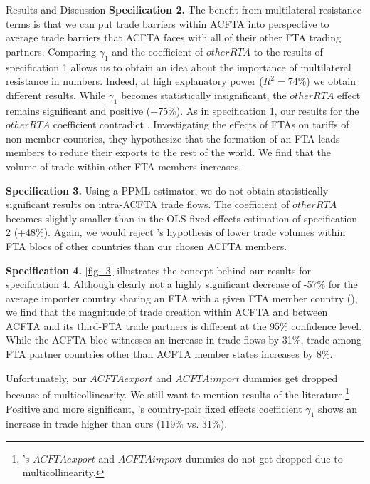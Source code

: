 \begin{section}{Results and Discussion}
\textbf{Specification 2.}
The benefit from multilateral resistance terms is that we can put trade barriers within ACFTA into perspective to average trade barriers that ACFTA faces with all of their other FTA trading partners. Comparing $\gamma_1$ and the coefficient of $otherRTA$ to the results of specification 1 allows us to obtain an idea about the importance of multilateral resistance in numbers. Indeed, at high explanatory power ($R^2 = 74\%$) we obtain different results. While $\gamma_1$ becomes statistically insignificant, the $otherRTA$ effect remains significant and positive (+75\%). As in specification 1, our results for the $otherRTA$ coefficient contradict \cite{ksy2018}. Investigating the effects of FTAs on tariffs of non-member countries, they hypothesize that the formation of an FTA leads members to reduce their exports to the rest of the world. We find that the volume of trade within other FTA members increases.

\textbf{Specification 3.}
Using a PPML estimator, we do not obtain statistically significant results on intra-ACFTA trade flows. The coefficient of $otherRTA$ becomes slightly smaller than in the OLS fixed effects estimation of specification 2 (+48\%). Again, we would reject \cite{ksy2018}'s hypothesis of lower trade volumes within FTA blocs of other countries than our chosen ACFTA members.

\textbf{Specification 4.}
\autoref{fig_3} illustrates the concept behind our results for specification 4. Although clearly not a highly significant decrease of -57\% for the average importer country sharing an FTA with a given FTA member country (\cite{dyz_2014}), we find that the magnitude of trade creation within ACFTA and between ACFTA and its third-FTA trade partners is different at the 95\% confidence level. While the ACFTA bloc witnesses an increase in trade flows by 31\%, trade among FTA partner countries other than ACFTA member states increases by 8\%.  

Unfortunately, our $ACFTAexport$ and $ACFTAimport$ dummies get dropped because of multicollinearity. We still want to mention results of the literature.\footnote{\cite{smz2014}'s $ACFTAexport$ and $ACFTAimport$ dummies do not get dropped due to multicollinearity.} Positive and more significant, \cite{smz2014}'s country-pair fixed effects coefficient $\gamma_1$ shows an increase in trade higher than ours (119\% vs. 31\%). 


\end{section}
